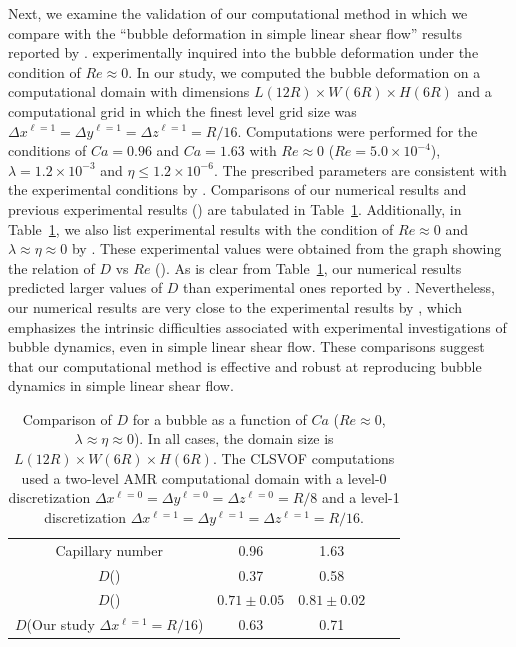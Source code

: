 \documentclass{elsarticle}
\newcommand{\lwh}[3]{L(#1R)\times W(#2R) \times H(#3R)}
\begin{document}

Next, we examine the validation of our computational method in which we compare with the ``bubble deformation in simple linear shear flow'' results reported by \citet{MulTobDreFisWin08}.  \citet{MulTobDreFisWin08} experimentally inquired into the bubble deformation under the condition of $Re \approx 0$.  In our study, we computed the bubble deformation on a computational domain with dimensions $\lwh{12}{6}{6}$ and a computational grid in which the finest level grid size was $\Delta x^{\ell=1} = \Delta y^{\ell=1} = \Delta z^{\ell=1} = R/16$.  Computations were performed for the conditions of $Ca = 0.96$ and $Ca = 1.63$ with $Re \approx 0$ ($Re = 5.0 \times 10^{-4}$),  $\lambda = 1.2 \times 10^{-3}$ and  $\eta \leq 1.2 \times 10^{-6}$.  The prescribed parameters are consistent with the experimental conditions by  \citet{MulTobDreFisWin08}.  Comparisons of our numerical results and previous experimental results (\citet{MulTobDreFisWin08}) are tabulated in Table~\ref{tab:DeComparisonRe=0}.  Additionally, in Table~\ref{tab:DeComparisonRe=0}, we also list experimental results with the condition of $Re \approx 0$ and $\lambda \approx \eta \approx 0$ by  \citet{RusMan02}.  These experimental values were obtained from the graph showing the relation of $D$ vs $Re$ (\citet{RusMan02}).  As is clear from Table~\ref{tab:DeComparisonRe=0}, our numerical results predicted larger values of $D$ than experimental ones reported by \citet{MulTobDreFisWin08}. Nevertheless, our numerical results are very close to the experimental results by \citet{RusMan02}, which emphasizes the intrinsic difficulties associated with experimental investigations of bubble dynamics, even in simple linear shear flow.  These comparisons suggest that our computational method is effective and robust at reproducing bubble dynamics in simple linear shear flow.
\begin{table}[tbh]
\caption{Comparison of $D$ for a bubble as a function of $Ca$ ($Re \approx 0$, $\lambda \approx \eta \approx 0$).  In all cases, the domain size is $\lwh{12}{6}{6}$.  The CLSVOF computations used a two-level AMR computational domain with a level-0 discretization $\Delta x^{\ell=0} = \Delta y^{\ell=0} = \Delta z^{\ell=0} = R/8$ and a level-1 discretization $\Delta x^{\ell=1} = \Delta y^{\ell=1} = \Delta z^{\ell=1} = R/16$.}
\label{tab:DeComparisonRe=0}
\center
\begin{tabular}{ c  c  c  c  c }
\hline
\hline
Capillary number & 0.96  & 1.63  \\
{$D$}(\citet{MulTobDreFisWin08})   & 0.37   &   0.58     \\
{$D$}(\citet{RusMan02})    & $0.71\pm 0.05$   &   $0.81\pm 0.02$     \\
{$D$}(Our study $\Delta x^{\ell=1}=R/16$)  & 0.63   &   0.71     \\
\hline
\hline
\end{tabular}
\end{table}
\end{document}
